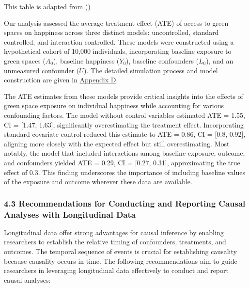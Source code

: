 \documentclass[
  single column]{article}
\begin{document}
\begin{table}

\caption{\label{tbl-lg}This table is adapted from
()}

\centering{

\examplelongitudinal

}

\end{table}%

Our analysis assessed the average treatment effect (ATE) of access to
green spaces on happiness across three distinct models: uncontrolled,
standard controlled, and interaction controlled. These models were
constructed using a hypothetical cohort of 10,000 individuals,
incorporating baseline exposure to green spaces (\(A_0\)), baseline
happiness (\(Y_0\)), baseline confounders (\(L_0\)), and an unmeasured
confounder (\(U\)). The detailed simulation process and model
construction are given in
\hyperref[appendix-simulate-longitudinal-ate]{Appendix D}.

The ATE estimates from these models provide critical insights into the
effects of green space exposure on individual happiness while accounting
for various confounding factors. The model without control variables
estimated ATE = 1.55, CI = {[}1.47, 1.63{]}, significantly
overestimating the treatment effect. Incorporating standard covariate
control reduced this estimate to ATE = 0.86, CI = {[}0.8, 0.92{]},
aligning more closely with the expected effect but still overestimating.
Most notably, the model that included interactions among baseline
exposure, outcome, and confounders yielded ATE = 0.29, CI = {[}0.27,
0.31{]}, approximating the true effect of 0.3. This finding underscores
the importance of including baseline values of the exposure and outcome
wherever these data are available.

\subsubsection{4.3 Recommendations for Conducting and Reporting Causal
Analyses with Longitudinal
Data}\label{recommendations-for-conducting-and-reporting-causal-analyses-with-longitudinal-data}

Longitudinal data offer strong advantages for causal inference by
enabling researchers to establish the relative timing of confounders,
treatments, and outcomes. The temporal sequence of events is crucial for
establishing causality because causality occurs in time. The following
recommendations aim to guide researchers in leveraging longitudinal data
effectively to conduct and report causal analyses:
\end{document}
